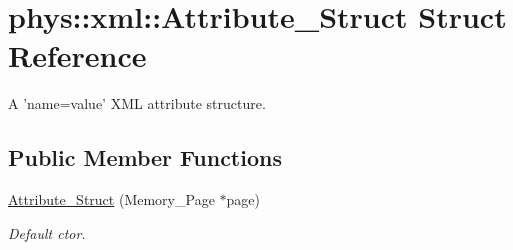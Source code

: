 \hypertarget{structphys_1_1xml_1_1Attribute__Struct}{
\section{phys::xml::Attribute\_\-Struct Struct Reference}
\label{d9/dc4/structphys_1_1xml_1_1Attribute__Struct}
}


A 'name=value' XML attribute structure.  


\subsection*{Public Member Functions}
\begin{DoxyCompactItemize}
\item 
\hypertarget{structphys_1_1xml_1_1Attribute__Struct_a0c4f5e8f8c7015fbdcb4d1088e5d339b}{
\hyperlink{structphys_1_1xml_1_1Attribute__Struct_a0c4f5e8f8c7015fbdcb4d1088e5d339b}{Attribute\_\-Struct} (Memory\_\-Page $\ast$page)}
\label{d9/dc4/structphys_1_1xml_1_1Attribute__Struct_a0c4f5e8f8c7015fbdcb4d1088e5d339b}

\begin{DoxyCompactList}\small\item\em Default ctor. \item\end{DoxyCompactList}\end{DoxyCompactItemize}

